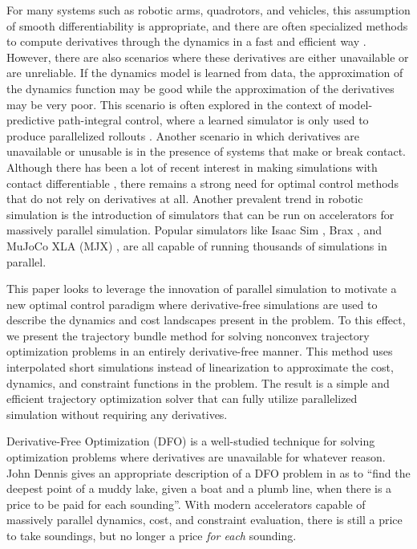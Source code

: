 For many systems such as robotic arms, quadrotors, and vehicles, this assumption of smooth differentiability is appropriate, and there are often specialized methods to compute derivatives through the dynamics in a fast and efficient way \cite{featherstone1987}. However, there are also scenarios where these derivatives are either unavailable or are unreliable. If the dynamics model is learned from data, the approximation of the dynamics function may be good while the approximation of the derivatives may be very poor. This scenario is often explored in the context of model-predictive path-integral control, where a learned simulator is only used to produce parallelized rollouts \cite{williams2016, wagener2019}. Another scenario in which derivatives are unavailable or unusable is in the presence of systems that make or break contact. Although there has been a lot of recent interest in making simulations with contact differentiable \cite{freeman2021, newbury2024, pang2023, tracy2023b, suh2022a, howell2022}, there remains a strong need for optimal control methods that do not rely on derivatives at all.  Another prevalent trend in robotic simulation is the introduction of simulators that can be run on accelerators for massively parallel simulation. Popular simulators like Isaac Sim \cite{makoviychuk2021, mittal2023}, Brax \cite{freeman2021}, and MuJoCo XLA (MJX) \cite{todorov2012}, are all capable of running thousands of simulations in parallel. 

This paper looks to leverage the innovation of parallel simulation to motivate a new optimal control paradigm where derivative-free simulations are used to describe the dynamics and cost landscapes present in the problem. To this effect, we present the trajectory bundle method for solving nonconvex trajectory optimization problems in an entirely derivative-free manner. This method uses interpolated short simulations instead of linearization to approximate the cost, dynamics, and constraint functions in the problem. The result is a simple and efficient trajectory optimization solver that can fully utilize parallelized simulation without requiring any derivatives. 

Derivative-Free Optimization (DFO) is a well-studied technique for solving optimization problems where derivatives are unavailable for whatever reason. John Dennis gives an appropriate description of a DFO problem in \cite{powell1994} as to ``find the deepest point of a muddy lake,
given a boat and a plumb line, when there is a price to be paid for each sounding''. With modern accelerators capable of massively parallel dynamics, cost, and constraint evaluation, there is still a price to take soundings, but no longer a price \textit{for each} sounding. 

